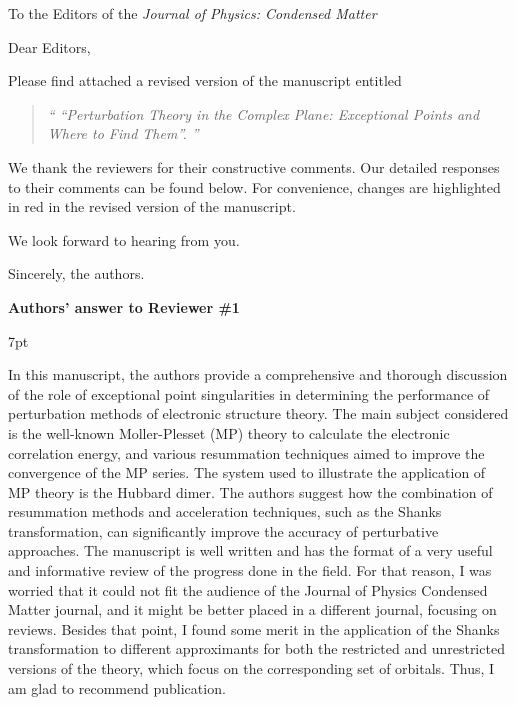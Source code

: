 \documentclass[10pt]{letter}
\renewenvironment{quote}
{\begin{quotation}\noindent\it``\ignorespaces}
{\ignorespaces''\end{quotation}}
\newenvironment{formal}{%
  \def\FrameCommand{%
    \hspace{1pt}%
    {\color{darkblue}\vrule width 2pt}%
    {\color{formalshade}\vrule width 4pt}%
    \colorbox{formalshade}%
  }%
  \MakeFramed{\advance\hsize-\width\FrameRestore}%
  \noindent\hspace{-4.55pt}%
  \begin{adjustwidth}{}{7pt}%
  \vspace{2pt}\vspace{2pt}%
}
{%
  \vspace{2pt}\end{adjustwidth}\endMakeFramed%
}
\begin{document}
\begin{letter}%
{To the Editors of the \textit{Journal of Physics: Condensed Matter}}

\opening{Dear Editors,}

\justifying
Please find attached a revised version of the manuscript entitled 
\begin{quote}
	\textit{``Perturbation Theory in the Complex Plane: Exceptional Points and Where to Find Them''}.
\end{quote}
We thank the reviewers for their constructive comments.
Our detailed responses to their comments can be found below.
For convenience, changes are highlighted in red in the revised version of the manuscript. 

We look forward to hearing from you.

\closing{Sincerely, the authors.}

\newpage
\noindent \textbf{\large Authors' answer to Reviewer \#1}

\begin{formal}
In this manuscript, the authors provide a comprehensive and thorough discussion of the role of exceptional point singularities in determining the performance of perturbation methods of electronic structure theory. 
The main subject considered is the well-known Moller-Plesset (MP) theory to calculate the electronic correlation energy, and various resummation techniques aimed to improve the convergence of the MP series. 
The system used to illustrate the application of MP theory is the Hubbard dimer. 
The authors suggest how the combination of resummation methods and acceleration techniques, such as the Shanks transformation, can significantly improve the accuracy of perturbative approaches. 
The manuscript is well written and has the format of a very useful and informative review of the progress done in the field. 
For that reason, I was worried that it could not fit the audience of the Journal of Physics Condensed Matter journal, and it might be better placed in a different journal, focusing on reviews. 
Besides that point, I found some merit in the application of the Shanks transformation to different approximants for both the restricted and unrestricted versions of the theory, which focus on the corresponding set of orbitals. 
Thus, I am glad to recommend publication.
\end{formal}



\end{letter}
\end{document}
